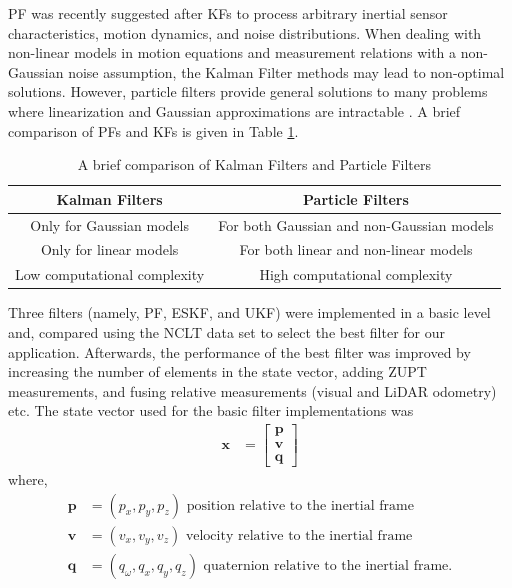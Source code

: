 \gls{PF} was recently suggested after \gls{KF}s to process arbitrary inertial sensor characteristics, motion dynamics, and noise distributions. When dealing with non-linear models in motion equations and measurement relations with a non-Gaussian noise assumption, the Kalman Filter methods may lead to non-optimal solutions. However, particle filters provide general solutions to many problems where linearization and Gaussian approximations are intractable \cite{ch27:ababsa2004comparison}. A brief comparison of \gls{PF}s and \gls{KF}s is given in Table \ref{table:ch:KFandPFComparison}.
\begin{table}[htp]
\centering
	\begin{tabular}{|c|c|} 
		\hline
		\textbf{Kalman Filters} & \textbf{Particle Filters} \\
		\hline
		Only for Gaussian models & For both Gaussian and non-Gaussian models\\
		\hline
		Only for linear models& For both linear and non-linear models
		\\
		\hline
		Low computational complexity&High computational complexity\\
		\hline
	\end{tabular}
	\caption{A brief comparison of Kalman Filters and Particle Filters}
	\label{table:ch:KFandPFComparison}
	\vspace{0.5cm}
\end{table}

Three filters (namely, \gls{PF}, \gls{ESKF}, and \gls{UKF}) were implemented in a basic level and, compared using the \gls{NCLT} data set to select the best filter for our application. Afterwards, the performance of the  best filter was improved by increasing the number of elements in the state vector, adding \gls{ZUPT} measurements, and fusing relative measurements (visual and \gls{LiDAR} odometry) etc. The state vector used for the basic filter implementations was
\begin{align}
\label{eq:ch:basicStateVector}
   \textbf{x} &= \left[\begin{matrix}{}\textbf{p}\\\textbf{v}\\\textbf{q}\end{matrix}\right]
\end{align}
where,
\begin{align}
	\textbf{p}&=(p_x,p_y,p_z) \text{ position relative to the inertial frame}\\
	\textbf{v}&=(v_x,v_y,v_z) \text{ velocity relative to the inertial frame}\\
	\textbf{q}&=(q_\omega,q_x,q_y,q_z) \text{ quaternion relative to the inertial frame}.
\end{align}

